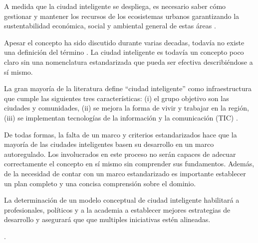 \documentclass[runningheads,a4paper,spanish]{llncs}
\begin{document}
A medida que la ciudad inteligente se despliega, es necesario saber cómo
gestionar y mantener los recursos de los ecosistemas urbanos garantizando la
sustentabilidad económica, social y ambiental general de estas áreas
\cite{aljowder_systematic_2019,stubinger_understanding_2020}.

Apesar el concepto ha sido discutido durante varias decadas, todavía no existe
una definición del término \cite{wahab_systematic_2020}. La ciudad inteligente
es todavía un concepto poco claro sin una nomenclatura estandarizada que pueda
ser efectiva describiéndose a sí mismo.

La gran mayoría de la literatura define “ciudad inteligente” como
infraestructura que cumple las siguientes tres características:
(i) el grupo objetivo son las ciudades y comunidades,
(ii) se mejora la forma de vivir y trabajar en la región,
(iii) se implementan tecnologías de la información y la comunicación (TIC)
\cite{stubinger_understanding_2020}.

De todas formas, la falta de un marco y criterios estandarizados hace que la
mayoría de las ciudades inteligentes basen su desarrollo en un marco
autoregulado. Los involucrados en este proceso no serán capaces de adecuar
correctamente el concepto en sí mismo sin comprender sus fundamentos. Además,
de la necesidad de contar con un marco estandarizado es importante establecer
un plan completo y una concisa comprensión sobre el dominio.

La determinación de un modelo conceptual de ciudad inteligente habilitará a
profesionales, políticos y a la academia a establecer mejores estrategias de
desarrollo y asegurará que que multiples iniciativas estén alineadas.

.





\end{document}
